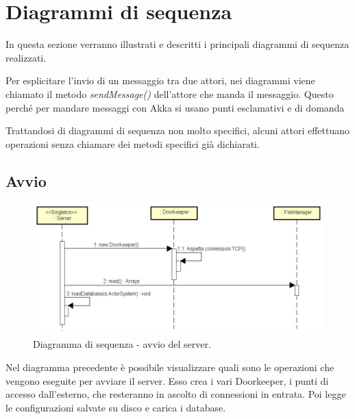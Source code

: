 \documentclass[a4paper]{article}
\begin{document}
	\newpage
	

	\section{Diagrammi di sequenza}
	In questa sezione verranno illustrati e descritti i principali diagrammi di sequenza realizzati. 
        
        Per esplicitare l'invio di un messaggio tra due attori, nei diagrammi viene chiamato il metodo \textit{sendMessage()} dell'attore che manda il messaggio. Questo perché per mandare messaggi con Akka si usano punti esclamativi e di domanda
        
        Trattandosi di diagrammi di sequenza non molto specifici, alcuni attori effettuano operazioni senza chiamare dei metodi specifici già 
        dichiarati. 

       \subsection{Avvio}
            \begin{figure} [H]
				\centering
				\includegraphics[width=\textwidth]{Sequenza/seqAvvio.jpg}
				\caption{Diagramma di sequenza - avvio del server.}
			\end{figure}
            Nel diagramma precedente è possibile visualizzare quali sono le operazioni che vengono eseguite per avviare il server. Esso crea i vari Doorkeeper, i punti di accesso dall'esterno, che resteranno in ascolto di connessioni in entrata. Poi legge le configurazioni salvate su disco e carica i database.
             
\end{document}

